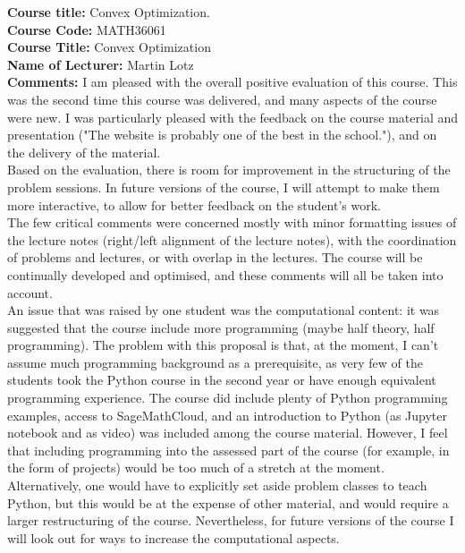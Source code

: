\documentclass[a4paper,10pt]{article}
\begin{document}

{\bf Course title: } Convex Optimization.\\

{\bf Course Code: } MATH36061\\

{\bf Course Title: } Convex Optimization\\

{\bf Name of Lecturer: } Martin Lotz\\
 
{\bf Comments: } I am pleased with the overall positive evaluation of this course. This was the second time this course was delivered, and many aspects of the course were new. I was particularly pleased with the feedback on the course material and presentation ("The website is probably one of the best in the school."), and on the delivery of the material.\\

Based on the evaluation, there is room for improvement in the structuring of the problem sessions. In future versions of the course, I will attempt to make them more interactive, to allow for better feedback on the student's work.\\

The few critical comments were concerned mostly with minor formatting issues of the lecture notes (right/left alignment of the lecture notes), with the coordination of problems and lectures, or with overlap in the lectures. The course will be continually developed and optimised, and these comments will all be taken into account. \\

An issue that was raised by one student was the computational content: it was suggested that the course include more programming (maybe half theory, half programming). The problem with this proposal is that, at the moment, I can't assume much programming background as a prerequisite, as very few of the students took the Python course in the second year or have enough equivalent programming experience. The course did include plenty of Python programming examples, access to SageMathCloud, and an introduction to Python (as Jupyter notebook and as video) was included among the course material. However, I feel that including programming into the assessed part of the course (for example, in the form of projects) would be too much of a stretch at the moment. Alternatively, one would have to explicitly set aside problem classes to teach Python, but this would be at the expense of other material, and would require a larger restructuring of the course. Nevertheless, for future versions of the course I will look out for ways to increase the computational aspects.\\
\end{document}
